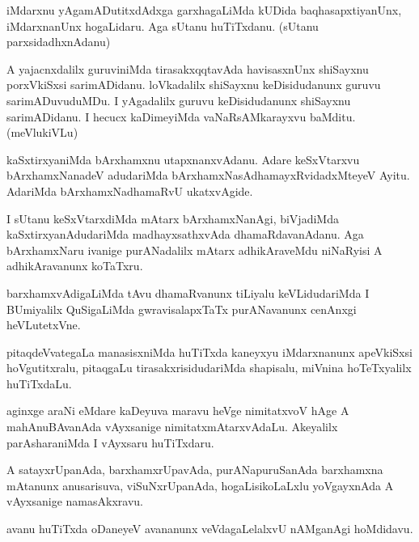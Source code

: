 \documentclass{article}
\begin{document}
\begin{mn}
iMdarxnu yAgamADutitxdAdxga garxhagaLiMda kUDida baqhasapxtiyanUnx,
iMdarxnanUnx hogaLidaru. Aga sUtanu huTiTxdanu. (sUtanu parxsidadhxnAdanu)
\end{mn}

\begin{mn}
A yajacnxdalilx guruviniMda tirasakxqqtavAda havisasxnUnx shiSayxnu
porxVkiSxsi sarimADidanu. loVkadalilx shiSayxnu keDisidudanunx guruvu
sarimADuvuduMDu. I yAgadalilx guruvu keDisidudanunx shiSayxnu
sarimADidanu. I hecucx kaDimeyiMda vaNaRsAMkarayxvu baMditu. (meVlukiVLu)
\end{mn}

\begin{mn}
kaSxtirxyaniMda bArxhamxnu utapxnanxvAdanu. Adare keSxVtarxvu
bArxhamxNanadeV adudariMda bArxhamxNasAdhamayxRvidadxMteyeV
Ayitu. AdariMda bArxhamxNadhamaRvU ukatxvAgide.
\end{mn}

\begin{mn}
I sUtanu keSxVtarxdiMda mAtarx bArxhamxNanAgi, biVjadiMda
kaSxtirxyanAdudariMda madhayxsathxvAda dhamaRdavanAdanu. Aga
bArxhamxNaru ivanige purANadalilx mAtarx adhikAraveMdu niNaRyisi A
adhikAravanunx koTaTxru.
\end{mn}

\begin{mn}
barxhamxvAdigaLiMda tAvu dhamaRvanunx tiLiyalu keVLidudariMda I
BUmiyalilx QuSigaLiMda gwravisalapxTaTx purANavanunx cenAnxgi heVLutetxVne.
\end{mn}

\begin{mn}
pitaqdeVvategaLa manasisxniMda huTiTxda kaneyxyu iMdarxnanunx
apeVkiSxsi hoVgutitxralu, pitaqgaLu tirasakxrisidudariMda shapisalu,
miVnina hoTeTxyalilx huTiTxdaLu.
\end{mn}

\begin{mn}
aginxge araNi eMdare kaDeyuva maravu heVge nimitatxvoV hAge A
mahAnuBAvanAda vAyxsanige nimitatxmAtarxvAdaLu. Akeyalilx
parAsharaniMda I vAyxsaru huTiTxdaru.
\end{mn}

\begin{mn}
A satayxrUpanAda, barxhamxrUpavAda, purANapuruSanAda barxhamxna
mAtanunx anusarisuva, viSuNxrUpanAda, hogaLisikoLaLxlu yoVgayxnAda A
vAyxsanige namasAkxravu.
\end{mn}

\begin{mn}
avanu huTiTxda oDaneyeV avananunx veVdagaLelalxvU nAMganAgi hoMdidavu.
\end{mn}
\end{document}
